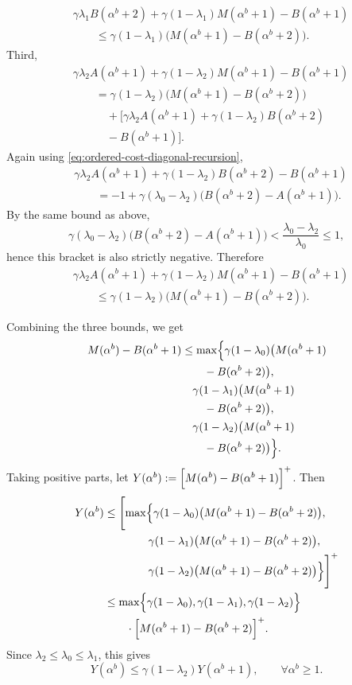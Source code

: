 \documentclass[letterpaper,journal]{IEEEtran}
\begin{document}
\[
\begin{aligned}
&\gamma\lambda_1B(\alpha^b+2)+\gamma(1-\lambda_1)M(\alpha^b+1)-B(\alpha^b+1)\\
&\qquad\le
\gamma(1-\lambda_1)\bigl(M(\alpha^b+1)-B(\alpha^b+2)\bigr).
\end{aligned}
\]
Third,
\begin{align*}
&\gamma\lambda_2A(\alpha^b+1)+\gamma(1-\lambda_2)M(\alpha^b+1)-B(\alpha^b+1)\\
&\qquad=\gamma(1-\lambda_2)
\bigl(M(\alpha^b+1)-B(\alpha^b+2)\bigr)\\
&\qquad\quad+\bigl[\gamma\lambda_2A(\alpha^b+1)
+\gamma(1-\lambda_2)B(\alpha^b+2)\\
&\qquad\quad -B(\alpha^b+1)\bigr].
\end{align*}
Again using \eqref{eq:ordered-cost-diagonal-recursion},
\[
\begin{aligned}
&\gamma\lambda_2A(\alpha^b+1)+\gamma(1-\lambda_2)B(\alpha^b+2)-B(\alpha^b+1)\\
&\qquad=-1+\gamma(\lambda_0-\lambda_2)
\bigl(B(\alpha^b+2)-A(\alpha^b+1)\bigr).
\end{aligned}
\]
By the same bound as above,
\[
\gamma(\lambda_0-\lambda_2)\bigl(B(\alpha^b+2)-A(\alpha^b+1)\bigr)
<
\frac{\lambda_0-\lambda_2}{\lambda_0}\le 1,
\]
hence this bracket is also strictly negative. Therefore
\[
\begin{aligned}
&\gamma\lambda_2A(\alpha^b+1)+\gamma(1-\lambda_2)M(\alpha^b+1)-B(\alpha^b+1)\\
&\qquad\le
\gamma(1-\lambda_2)\bigl(M(\alpha^b+1)-B(\alpha^b+2)\bigr).
\end{aligned}
\]

Combining the three bounds, we get
\begin{align*}
M(\alpha^b)-B(\alpha^b+1)
&\leq \max\Bigl\{\gamma(1-\lambda_0)\bigl(M(\alpha^b+1)\\
&\qquad -B(\alpha^b+2)\bigr),\\
&\quad \gamma(1-\lambda_1)\bigl(M(\alpha^b+1)\\
&\qquad -B(\alpha^b+2)\bigr),\\
&\quad \gamma(1-\lambda_2)\bigl(M(\alpha^b+1)\\
&\qquad -B(\alpha^b+2)\bigr) \Bigr\}.
\end{align*}
Taking positive parts, let $Y(\alpha^b) := \Bigl[M(\alpha^b)-B(\alpha^b+1)\Bigr]^+$. Then
\begin{align*}
Y(\alpha^b) &\leq \Biggl[\max\Bigl\{\gamma(1-\lambda_0)\bigl(M(\alpha^b+1)-B(\alpha^b+2)\bigr),\\
&\qquad\qquad \gamma(1-\lambda_1)\bigl(M(\alpha^b+1)-B(\alpha^b+2)\bigr),\\
&\qquad\qquad \gamma(1-\lambda_2)\bigl(M(\alpha^b+1)-B(\alpha^b+2)\bigr)\Bigr\}\Biggr]^+\\
&\leq \max\Bigl\{ \gamma(1-\lambda_0),\gamma(1-\lambda_1),\gamma(1-\lambda_2)\Bigr\}\\
&\qquad\cdot\Bigl[M(\alpha^b+1)-B(\alpha^b+2)\Bigr]^+.
\end{align*}
Since $\lambda_2\le \lambda_0\le \lambda_1$, this gives
\[
Y(\alpha^b)\le \gamma(1-\lambda_2)Y(\alpha^b+1),\qquad \forall \alpha^b\ge 1.
\]
\end{document}
